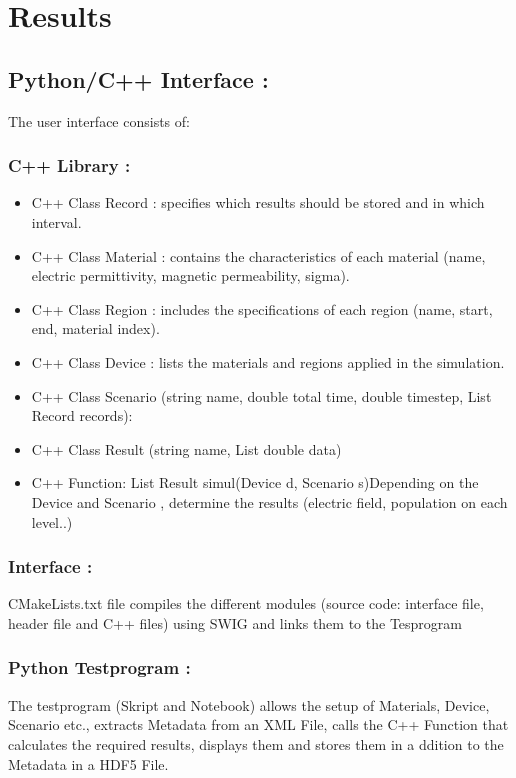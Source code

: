 \chapter{Results}
\label{chapter:results}
\section{Python/C++ Interface :}
The user interface consists of:
\subsection{C++ Library :} 
\begin{itemize}
\item C++ Class Record : specifies which results should be stored and in which interval.
\item C++ Class Material : contains the characteristics of each material (name, electric permittivity, magnetic permeability, sigma).
\item C++ Class Region : includes the specifications of each region (name, start, end, material index).
\item C++ Class Device : lists the materials and regions applied in the simulation.
\item C++ Class Scenario (string name, double total time, double timestep, List Record records): 
\item C++ Class Result (string name, List double data)
\item C++ Function: List Result simul(Device d, Scenario s)Depending on the Device and Scenario , determine the results (electric field, population on each level..)
\end{itemize}

\subsection{Interface :}
CMakeLists.txt file compiles the different modules (source code: interface file, header file and C++ files) using SWIG and links them to the Tesprogram

\subsection{Python Testprogram :}
The testprogram (Skript and Notebook) allows the setup of Materials, Device, Scenario etc., extracts Metadata from an XML File, calls the C++ Function that calculates the required results, displays them and  stores them in a ddition to the Metadata in a HDF5 File.

